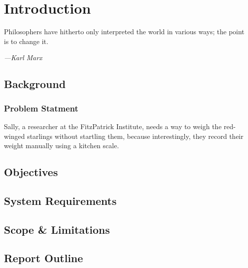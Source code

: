\documentclass[class=report,11pt,crop=false]{standalone}
\begin{document}
\chapter{Introduction}
\epigraph{Philosophers have hitherto only interpreted the world in various ways; the point is to change it.}%
    {\emph{---Karl Marx}}
\vspace{0.5cm}


\section{Background}
\subsection{Problem Statment}
Sally, a researcher at the FitzPatrick Institute, needs a way to weigh the red-winged starlings without startling them, because interestingly, they record their weight manually using a kitchen scale.

\section{Objectives}


\section{System Requirements}


\section{Scope \& Limitations}


\section{Report Outline}


\ifstandalone

\printnoidxglossary[type=\acronymtype,nonumberlist]
\fi
\end{document}
